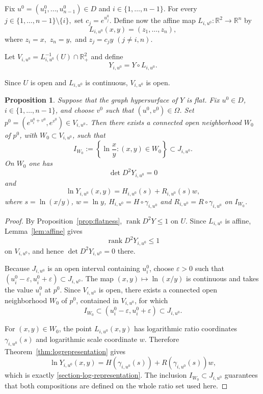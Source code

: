 \documentclass[12pt]{amsart}
\newtheorem{proposition}{Proposition}[section]
\begin{document}
Fix
\(
u^0=(u_1^0,\ldots,u_{n-1}^0)\in D
\)
and
\(
i\in\{1,\ldots,n-1\}.
\)
For every
\(
j\in\{1,\ldots,n-1\}\setminus\{i\},
\)
set
\(
c_j=e^{u_j^0}.
\)
Define now the affine map
\(
L_{i,u^0}:\mathbb R^2\longrightarrow\mathbb R^n
\)
by
\[
L_{i,u^0}(x,y)
=
(z_1,\ldots,z_n),
\]
where
\(
z_i=x,
\)
\(
z_n=y,
\)
and
\(
z_j=c_jy
\)
$(j\neq i,n)$.

Let
\(
V_{i,u^0}
=
L_{i,u^0}^{-1}(U)\cap\mathbb R_+^2
\)
and define
\[
Y_{i,u^0}
=
Y\circ L_{i,u^0}.
\]

Since \(U\) is open and \(L_{i,u^0}\) is continuous,
\(V_{i,u^0}\) is open.

\begin{proposition}\label{prop:affine-log-sections}
Suppose that the graph hypersurface of $Y$ is flat. Fix $u^0\in D$, $i\in\{1,\ldots,n-1\}$, and choose $v^0$ such that $(u^0,v^0)\in\Omega$. Set
\(
p^0=\left(e^{u_i^0+v^0},e^{v^0}\right)\in V_{i,u^0}.
\)
Then there exists a connected open neighborhood $W_0$ of $p^0$, with $W_0\subset V_{i,u^0}$, such that
\[
I_{W_0}:=\left\{\ln\frac{x}{y}:(x,y)\in W_0\right\}\subset J_{i,u^0}.
\]
On $W_0$ one has
\[
\det D^2Y_{i,u^0}=0
\]
and
\begin{equation}\label{section-log-representation}
\ln Y_{i,u^0}(x,y)=H_{i,u^0}(s)+R_{i,u^0}(s)w,
\end{equation}
where $s=\ln(x/y)$, $w=\ln y$, $H_{i,u^0}=H\circ\gamma_{i,u^0}$ and $R_{i,u^0}=R\circ\gamma_{i,u^0}$ on $I_{W_0}$.
\end{proposition}

\begin{proof}
By Proposition~\ref{prop:flatness}, $\operatorname{rank}D^2Y\le1$ on $U$. Since $L_{i,u^0}$ is affine, Lemma~\ref{lem:affine} gives
\[
\operatorname{rank}D^2Y_{i,u^0}\le1
\]
on $V_{i,u^0}$, and hence $\det D^2Y_{i,u^0}=0$ there.

Because $J_{i,u^0}$ is an open interval containing $u_i^0$, choose $\varepsilon>0$ such that
\(
(u_i^0-\varepsilon,u_i^0+\varepsilon)\subset J_{i,u^0}.
\)
The map $(x,y)\mapsto\ln(x/y)$ is continuous and takes the value $u_i^0$ at $p^0$. Since $V_{i,u^0}$ is open, there exists a connected open neighborhood $W_0$ of $p^0$, contained in $V_{i,u^0}$, for which
\[
I_{W_0}\subset(u_i^0-\varepsilon,u_i^0+\varepsilon)\subset J_{i,u^0}.
\]

For $(x,y)\in W_0$, the point $L_{i,u^0}(x,y)$ has logarithmic ratio coordinates $\gamma_{i,u^0}(s)$ and logarithmic scale coordinate $w$. Therefore Theorem~\ref{thm:logrepresentation} gives
\[
\ln Y_{i,u^0}(x,y)
=H(\gamma_{i,u^0}(s))+R(\gamma_{i,u^0}(s))w,
\]
which is exactly \eqref{section-log-representation}. The inclusion $I_{W_0}\subset J_{i,u^0}$ guarantees that both compositions are defined on the whole ratio set used here.
\end{proof}
\end{document}
